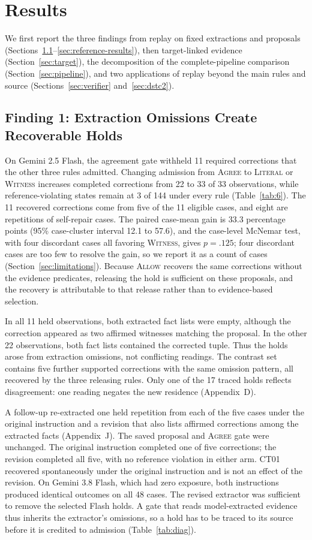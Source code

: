 \documentclass[acmsmall,review]{acmart}
\newcommand{\agree}{\textsc{Agree}}
\newcommand{\allow}{\textsc{Allow}}
\newcommand{\literal}{\textsc{Literal}}
\newcommand{\witness}{\textsc{Witness}}
\begin{document}
\section{Results}\label{sec:results}
We first report the three findings from replay on fixed extractions and proposals (Sections~\ref{sec:extraction}--\ref{sec:reference-results}), then target-linked evidence (Section~\ref{sec:target}), the decomposition of the complete-pipeline comparison (Section~\ref{sec:pipeline}), and two applications of replay beyond the main rules and source (Sections~\ref{sec:verifier} and~\ref{sec:dstc2}).

\subsection{Finding 1: Extraction Omissions Create Recoverable Holds}\label{sec:extraction}
On Gemini 2.5 Flash, the agreement gate withheld 11 required corrections that the other three rules admitted. Changing admission from \agree{} to \literal{} or \witness{} increases completed corrections from 22 to 33 of 33 observations, while reference-violating states remain at 3 of 144 under every rule (Table~\ref{tab:6}). The 11 recovered corrections come from five of the 11 eligible cases, and eight are repetitions of self-repair cases. The paired case-mean gain is 33.3 percentage points (95\% case-cluster interval 12.1 to 57.6), and the case-level McNemar test, with four discordant cases all favoring \witness{}, gives $p=.125$; four discordant cases are too few to resolve the gain, so we report it as a count of cases (Section~\ref{sec:limitations}). Because \allow{} recovers the same corrections without the evidence predicates, releasing the hold is sufficient on these proposals, and the recovery is attributable to that release rather than to evidence-based selection.

In all 11 held observations, both extracted fact lists were empty, although the correction appeared as two affirmed witnesses matching the proposal. In the other 22 observations, both fact lists contained the corrected tuple. Thus the holds arose from extraction omissions, not conflicting readings. The contrast set contains five further supported corrections with the same omission pattern, all recovered by the three releasing rules. Only one of the 17 traced holds reflects disagreement: one reading negates the new residence (Appendix~D).

A follow-up re-extracted one held repetition from each of the five cases under the original instruction and a revision that also lists affirmed corrections among the extracted facts (Appendix~J). The saved proposal and \agree{} gate were unchanged. The original instruction completed one of five corrections; the revision completed all five, with no reference violation in either arm. CT01 recovered spontaneously under the original instruction and is not an effect of the revision. On Gemini 3.8 Flash, which had zero exposure, both instructions produced identical outcomes on all 48 cases. The revised extractor was sufficient to remove the selected Flash holds. A gate that reads model-extracted evidence thus inherits the extractor's omissions, so a hold has to be traced to its source before it is credited to admission (Table~\ref{tab:diag}).
\end{document}
